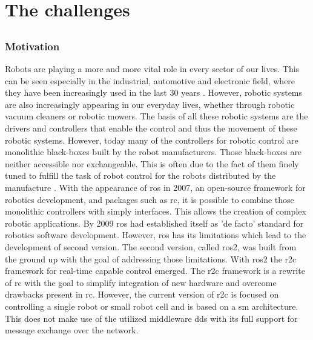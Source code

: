 \part{The challenges}
\chapter{}
\label{sec:Introduction}
\section{Motivation}
Robots are playing a more and more vital role in every sector of our lives. This can be seen especially in the industrial, automotive and electronic field, where they have been increasingly used in the last 30 years \cite{cheng_rise_2019, bilancia_overview_2023}. However, robotic systems are also increasingly appearing in our everyday lives, whether through robotic vacuum cleaners or robotic mowers. The basis of all these robotic systems are the drivers and controllers that enable the control and thus the movement of these robotic systems. However, today many of the controllers for robotic control are monolithic black-boxes built by the robot manufacturers. Those black-boxes are neither accessible nor exchangeable. This is often due to the fact of them finely tuned to fulfill the task of robot control for the robots distributed by the manufacture \cite{puck_distributed_2020, plasberg_towards_2022}. \newline
With the appearance of \gls{ros} in 2007, an open-source framework for robotics development, and packages such as \gls{rc}, it is possible to combine those monolithic controllers with simply interfaces. This allows the creation of complex robotic applications. By 2009 \gls{ros} had established itself as 'de facto' standard for robotics software development. However, \gls{ros} has its limitations which lead to the development of second version. The second version, called \gls{ros2}, was built from the ground up with the goal of addressing those limitations. \newline
With \gls{ros2} the \gls{r2c} framework for real-time capable control emerged. The \gls{r2c} framework is a rewrite of \gls{rc} with the goal to simplify integration of new hardware and overcome drawbacks present in \gls{rc}. However, the current version of \gls{r2c} is focused on controlling a single robot or small robot cell and is based on a \gls{sm} architecture. This does not make use of the utilized middleware \gls{dds} with its full support for message exchange over the network. \newline

